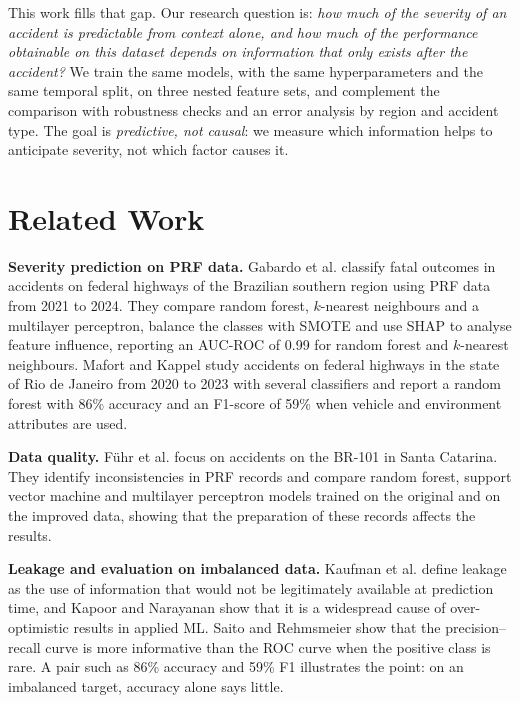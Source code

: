 \documentclass[12pt]{article}
\begin{document}
This work fills that gap. Our research question is: \emph{how much of the
severity of an accident is predictable from context alone, and how much of the
performance obtainable on this dataset depends on information that only exists
after the accident?} We train the same models, with the same hyperparameters
and the same temporal split, on three nested feature sets, and complement the
comparison with robustness checks and an error analysis by region and accident
type. The goal is \emph{predictive, not causal}: we measure which information
helps to anticipate severity, not which factor causes it.

\section{Related Work}


\textbf{Severity prediction on PRF data.} Gabardo et al. \cite{gabardo2025}
classify fatal outcomes in accidents on federal highways of the Brazilian
southern region using PRF data from 2021 to 2024. They compare random forest,
$k$-nearest neighbours and a multilayer perceptron, balance the classes with
SMOTE and use SHAP to analyse feature influence, reporting an AUC-ROC of 0.99
for random forest and $k$-nearest neighbours. Mafort and Kappel
\cite{mafort2025} study accidents on federal highways in the state of Rio de
Janeiro from 2020 to 2023 with several classifiers and report a random forest
with 86\% accuracy and an F1-score of 59\% when vehicle and environment
attributes are used.

\textbf{Data quality.} F\"uhr et al. \cite{fuhr2025} focus on accidents on the
BR-101 in Santa Catarina. They identify inconsistencies in PRF records and
compare random forest, support vector machine and multilayer perceptron models
trained on the original and on the improved data, showing that the preparation
of these records affects the results.

\textbf{Leakage and evaluation on imbalanced data.} Kaufman et al.
\cite{kaufman2012} define leakage as the use of information that would not be
legitimately available at prediction time, and Kapoor and Narayanan
\cite{kapoor2023} show that it is a widespread cause of over-optimistic results
in applied ML. Saito and Rehmsmeier \cite{saito2015} show that the
precision--recall curve is more informative than the ROC curve when the
positive class is rare. A pair such as 86\% accuracy and 59\% F1 illustrates
the point: on an imbalanced target, accuracy alone says little.
\end{document}

